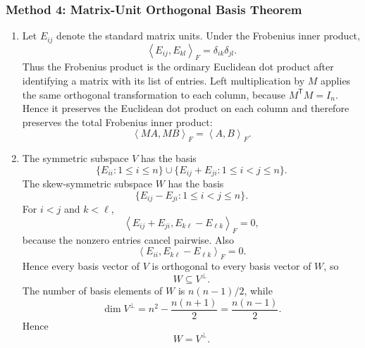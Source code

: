 \documentclass[12pt]{article}
\newcommand{\ipF}[2]{\left\langle #1,#2\right\rangle_F}
\newcommand{\T}{\mathsf{T}}
\begin{document}
\subsubsection{Method 4: Matrix-Unit Orthogonal Basis Theorem}
\begin{enumerate}[label=(\alph*)]
  \item Let $E_{ij}$ denote the standard matrix units. Under the Frobenius inner product,
  \[
    \ipF{E_{ij}}{E_{kl}}=\delta_{ik}\delta_{jl}.
  \]
  Thus the Frobenius product is the ordinary Euclidean dot product after identifying a matrix with its list of entries. Left multiplication by $M$ applies the same orthogonal transformation to each column, because $M^\T M=I_n$. Hence it preserves the Euclidean dot product on each column and therefore preserves the total Frobenius inner product:
  \[
    \boxed{\ipF{MA}{MB}=\ipF{A}{B}.}
  \]

  \item The symmetric subspace $V$ has the basis
  \[
    \{E_{ii}:1\le i\le n\}
    \cup
    \{E_{ij}+E_{ji}:1\le i<j\le n\}.
  \]
  The skew-symmetric subspace $W$ has the basis
  \[
    \{E_{ij}-E_{ji}:1\le i<j\le n\}.
  \]
  For $i<j$ and $k<\ell$,
  \[
    \ipF{E_{ij}+E_{ji}}{E_{k\ell}-E_{\ell k}}=0,
  \]
  because the nonzero entries cancel pairwise. Also
  \[
    \ipF{E_{ii}}{E_{k\ell}-E_{\ell k}}=0.
  \]
  Hence every basis vector of $V$ is orthogonal to every basis vector of $W$, so
  \[
    W\subseteq V^\perp.
  \]
  The number of basis elements of $W$ is $n(n-1)/2$, while
  \[
    \dim V^\perp=n^2-\frac{n(n+1)}2=\frac{n(n-1)}2.
  \]
  Hence
  \[
    \boxed{W=V^\perp.}
  \]
\end{enumerate}

\newpage
\end{document}
